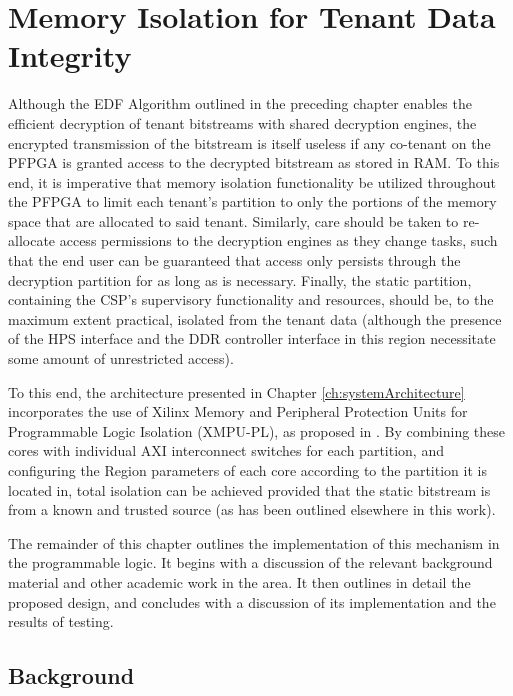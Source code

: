 
\chapter{Memory Isolation for Tenant Data Integrity}\label{ch:dmaProtection}
Although the EDF Algorithm outlined in the preceding chapter enables the efficient decryption of tenant bitstreams with shared decryption engines, the encrypted transmission of the bitstream is itself useless if any co-tenant on the PFPGA is granted access to the decrypted bitstream as stored in RAM. To this end, it is imperative that memory isolation functionality be utilized throughout the PFPGA to limit each tenant's partition to only the portions of the memory space that are allocated to said tenant. Similarly, care should be taken to re-allocate access permissions to the decryption engines as they change tasks, such that the end user can be guaranteed that access only persists through the decryption partition for as long as is necessary. Finally, the static partition, containing the CSP's supervisory functionality and resources, should be, to the maximum extent practical, isolated from the tenant data (although the presence of the HPS interface and the DDR controller interface in this region necessitate some amount of unrestricted access).

To this end, the architecture presented in Chapter \ref{ch:systemArchitecture} incorporates the use of Xilinx Memory and Peripheral Protection Units for Programmable Logic Isolation (XMPU-PL), as proposed in \cite{noauthor_memory_2021}. By combining these cores with individual AXI interconnect switches for each partition, and configuring the Region parameters of each core according to the partition it is located in, total isolation can be achieved provided that the static bitstream is from a known and trusted source (as has been outlined elsewhere in this work).

The remainder of this chapter outlines the implementation of this mechanism in the programmable logic. It begins with a discussion of the relevant background material and other academic work in the area. It then outlines in detail the proposed design, and concludes with a discussion of its implementation and the results of testing.

\section{Background}\label{sec:DMABackground}

